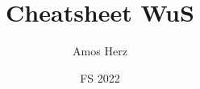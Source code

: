 \documentclass[a4paper,8pt]{extarticle}
\title{\vspace{-1cm}Cheatsheet WuS\vspace{-0.65cm}}
\author{Amos Herz\vspace{-0.5cm}}
\date{FS 2022}
\newcommand\1{\mathbbm{1}}
\begin{document}
\begin{multicols*}{3}

\maketitle













\end{multicols*}
\begin{small}

\end{small}

%
\end{document}
